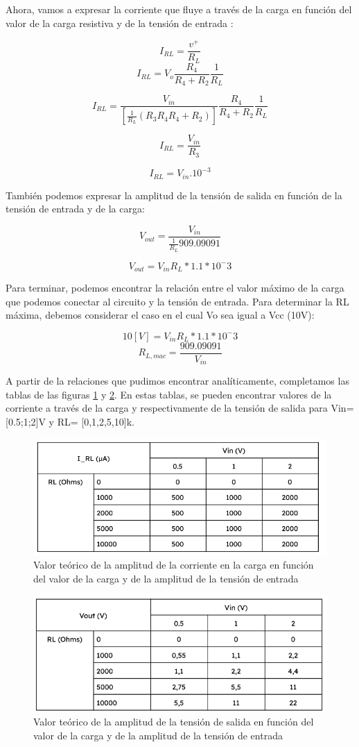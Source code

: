 Ahora, vamos a expresar la corriente que fluye a través de la carga en
función del valor de la carga resistiva y de la tensión de entrada :


\[I_{RL}= \frac{v^+}{R_L}\]
\[I_{RL}= V_o\frac{R_4}{R_4 + R_2} \frac{1}{R_L}\]


\[I_{RL}=\frac{V_{in}}{\left[\frac{1}{R_L}(R_3{R_4}{R_4 + R_2})\right]}\frac{R_4}{R_4 + R_2}\frac{1}{R_L}\]

\[I_{RL}= \frac{V_{in}}{R_3}\]

\[I_{RL}= V_{in}.10^{-3}\]

También podemos expresar la amplitud de la tensión de salida en función de la tensión de entrada y de la carga:

\[V_{out} = \frac{V_{in}}{\frac{1}{R_L}909.09091}\]

\[V_{out} = V_{in}R_L*1.1*10^-3\]

Para terminar, podemos encontrar la relación entre el valor máximo de la carga que podemos conectar al circuito y la tensión de entrada. Para determinar la RL máxima, debemos considerar el caso en el cual Vo sea igual a Vcc (10V):

\[10[V] = V_{in}R_L*1.1*10^-3\]
\[R_{L,mac} = \frac{909.09091}{V_{in}}\]


A partir de la relaciones que pudimos encontrar analíticamente, completamos las tablas de las figuras \ref{fig:IRL_vs_carga} y \ref{fig:Vo_vs_carga}. En estas tablas, se pueden encontrar valores de la corriente a través de la carga y respectivamente de la tensión de salida para Vin=[0.5;1;2]V y RL= [0,1,2,5,10]k.

\begin{figure}[H]
    \centering
    \includegraphics[width=0.5\linewidth]{Secciones/Circuito2/Tabla3.png}
    \caption{Valor teórico de la amplitud de la corriente en la carga en función del valor de la carga y de la amplitud de la tensión de entrada}
    \label{fig:IRL_vs_carga}
\end{figure}

\begin{figure}[H]
    \centering
    \includegraphics[width=0.5\linewidth]{Secciones/Circuito2/Tabla4.png}
    \caption{Valor teórico de la amplitud de la tensión de salida en función del valor de la carga y de la amplitud de la tensión de entrada}
    \label{fig:Vo_vs_carga}
\end{figure}

